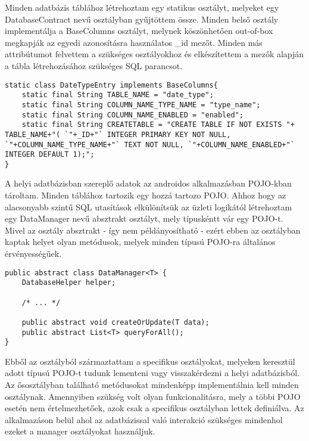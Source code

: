 Minden adatbázis táblához létrehoztam egy statikus osztályt, melyeket egy DatabaseContract nevű osztályban gyűjtöttem össze. Minden belső osztály implementálja a BaseColumns osztályt, melynek köszönhetően out-of-box megkapják az egyedi azonosításra használatos  \_id mezőt. Minden más attribútumot felvettem a szükséges osztályokhoz és elkészítettem a mezők alapján a tábla létrehozásához szükséges SQL parancsot.
\begin{lstlisting}
static class DateTypeEntry implements BaseColumns{
	static final String TABLE_NAME = "date_type";
	static final String COLUMN_NAME_TYPE_NAME = "type_name";
	static final String COLUMN_NAME_ENABLED = "enabled";
	static final String CREATETABLE = "CREATE TABLE IF NOT EXISTS "+ TABLE_NAME+"( `"+_ID+"` INTEGER PRIMARY KEY NOT NULL, `"+COLUMN_NAME_TYPE_NAME+"` TEXT NOT NULL, `"+COLUMN_NAME_ENABLED+"` INTEGER DEFAULT 1);";
}
\end{lstlisting}
A helyi adatbázisban szereplő adatok az androidos alkalmazásban POJO-kban tároltam. Minden táblához tartozik egy hozzá tartozo POJO.
Ahhoz hogy az alacsonyabb szintű SQL utasítások elkülönítsük az üzleti logikától létrehoztam egy DataManager nevű absztrakt osztályt, mely típuskéntt vár egy POJO-t. Mivel az osztály absztrakt - így nem példányosítható - ezért ebben az osztályban kaptak helyet olyan metódusok, melyek minden típusú POJO-ra általános érvényességűek. 
\begin{lstlisting}
public abstract class DataManager<T> {	
    DatabaseHelper helper;
	
	/* ... */

    public abstract void createOrUpdate(T data);
    public abstract List<T> queryForAll();
}
\end{lstlisting}
Ebből az osztályból származtattam a specifikus osztályokat, melyeken keresztül adott típusú POJO-t tudunk lementeni vagy visszakérdezni a helyi adatbázisból. Az ősosztályban található metódusokat mindenképp implementálnia kell minden osztálynak. Amennyiben szükség volt olyan funkcionalitásra, mely a többi POJO esetén nem értelmezhetőek, azok csak a specifikus osztályban lettek definiálva.
Az alkalmazáson belül ahol az adatbázissal való interakció szükséges mindenhol ezeket a manager osztályokat használjuk. 


